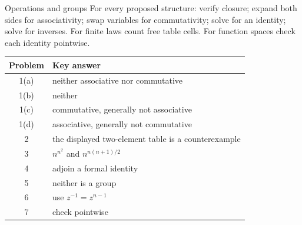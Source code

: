 \documentclass[11pt,openany]{book}
\theoremstyle{definition}
\begin{document}
\begin{checkpoint}{Operations and groups}
For every proposed structure: verify closure; expand both sides for associativity; swap variables for commutativity; solve for an identity; solve for inverses. For finite laws count free table cells. For function spaces check each identity pointwise.
\end{checkpoint}
\begin{center}\begin{tabular}{cl}\toprule Problem&Key answer\\\midrule
1(a)&neither associative nor commutative\\1(b)&neither\\1(c)&commutative, generally not associative\\1(d)&associative, generally not commutative\\
2&the displayed two-element table is a counterexample\\3&$n^{n^2}$ and $n^{n(n+1)/2}$\\4&adjoin a formal identity\\5&neither is a group\\6&use $z^{-1}=z^{n-1}$\\7&check pointwise\\\bottomrule\end{tabular}\end{center}
\end{document}
